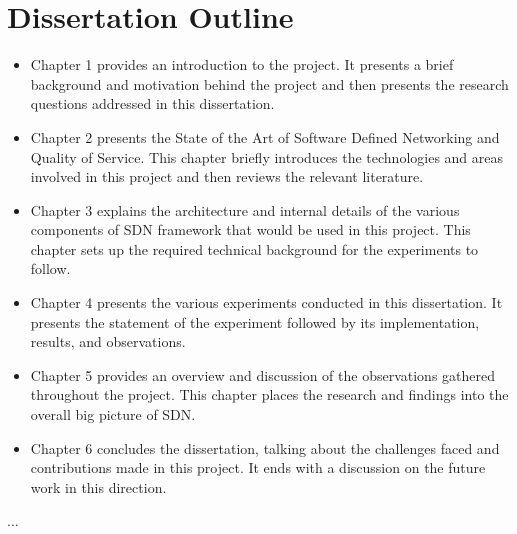 \section{Dissertation Outline}
\begin{itemize}

\item Chapter 1 provides an introduction to the project. It presents a brief background
and motivation behind the project and then presents the research questions addressed
in this dissertation.
\item Chapter 2 presents the State of the Art of Software Defined Networking and Quality
of Service. This chapter briefly introduces the technologies and areas involved in
this project and then reviews the relevant literature.
\item Chapter 3 explains the architecture and internal details of the various components
of SDN framework that would be used in this project. This chapter sets up the
required technical background for the experiments to follow.
\item  Chapter 4 presents the various experiments conducted in this dissertation. It
presents the statement of the experiment followed by its implementation, results,
and observations.
\item Chapter 5 provides an overview and discussion of the observations gathered throughout
the project. This chapter places the research and findings into the overall big picture of SDN.
\item Chapter 6 concludes the dissertation, talking about the challenges faced and contributions
made in this project. It ends with a discussion on the future work in this direction.
\end{itemize}
	...
